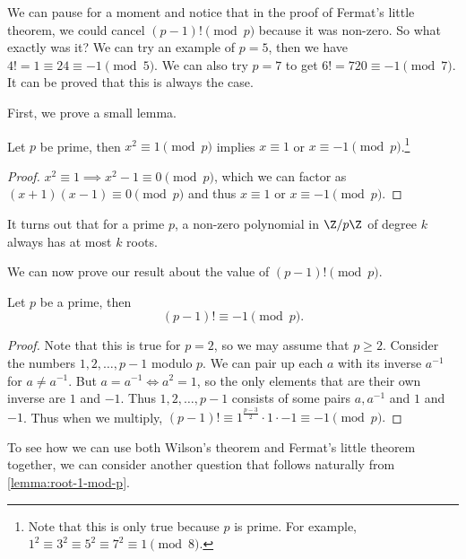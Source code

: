 \documentclass[a4paper]{scrreprt}
\begin{document}
We can pause for a moment and notice that in the proof of Fermat's little theorem, we could cancel $(p - 1)! \pmod{p}$ because it was non-zero. So what exactly was it? We can try an example of $p = 5$, then we have $4! = 1 \equiv 24 \equiv - 1 \pmod{5}$. We can also try $p = 7$ to get $6! = 720 \equiv -1 \pmod{7}$. It can be proved that this is always the case.

First, we prove a small lemma.

\begin{lemma}\label{lemma:root-1-mod-p}
	Let $p$ be prime, then $x^2 \equiv 1 \pmod{p}$ implies $x \equiv 1$ or $x \equiv -1 \pmod{p}$.\footnote{Note that this is only true because $p$ is prime. For example, $1^2 \equiv 3^2 \equiv 5^2 \equiv 7^2 \equiv 1 \pmod{8}$.}
\end{lemma}
\begin{proof}
	$x^2 \equiv 1 \implies x^2 - 1 \equiv 0 \pmod{p}$, which we can factor as $(x + 1)(x - 1) \equiv 0 \pmod{p}$ and thus $x \equiv 1$ or $x \equiv -1 \pmod{p}$.
\end{proof}
\begin{remark}
	It turns out that for a prime $p$, a non-zero polynomial in $\Z/p\Z$ of degree $k$ always has at most $k$ roots.
\end{remark}

We can now prove our result about the value of $(p - 1)! \pmod{p}$.

\begin{theorem}
	Let $p$ be a prime, then
	$$
	(p - 1)! \equiv - 1\pmod{p}.
	$$
\end{theorem}
\begin{proof}
	Note that this is true for $p = 2$, so we may assume that $p \geq 2$. Consider the numbers $1, 2, \dots, p - 1$ modulo $p$. We can pair up each $a$ with its inverse $a^{-1}$ for $a \neq a^{-1}$. But $a = a^{-1} \iff a^2 = 1$, so the only elements that are their own inverse are $1$ and $-1$. Thus $1, 2, \dots, p - 1$ consists of some pairs $a, a^{-1}$ and $1$ and $-1$. Thus when we multiply,
	$
	(p - 1)! \equiv 1^{\frac{p - 3}{2}} \cdot 1 \cdot -1 \equiv -1 \pmod{p}.
	$
\end{proof}

To see how we can use both Wilson's theorem and Fermat's little theorem together, we can consider another question that follows naturally from \autoref{lemma:root-1-mod-p}.
\end{document}
